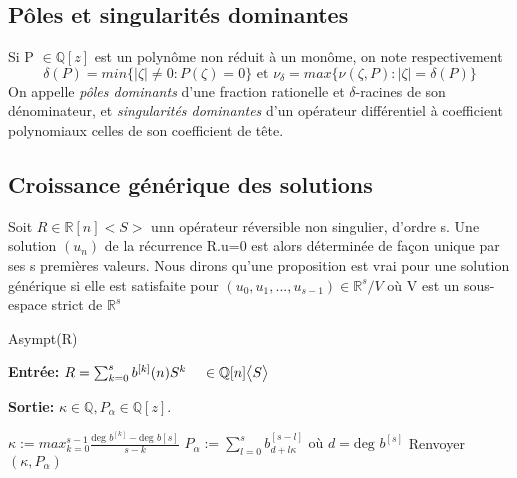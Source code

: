 \documentclass[a4paper,10.5pt]{article}
\begin{document}
	\subsection{Pôles et singularités dominantes}
	
	\begin{definition} Si P $\in \mathbb{Q}[z]$ est un polynôme non réduit à un monôme, on note respectivement
		\[\delta(P)=min\{|\zeta| \neq 0: P(\zeta)=0\} \text{ et } \nu_{\delta}=max\{\nu(\zeta,P):|\zeta|=\delta(P)\}\] 
		On appelle \textit{pôles dominants} d'une fraction rationelle et $\delta$-racines  de son dénominateur, et \textit{singularités dominantes} d'un opérateur différentiel à coefficient polynomiaux celles de son coefficient de tête.  
	\end{definition}
	
	\subsection{Croissance générique des solutions}
	
	\begin{definition} Soit $R \in \mathbb{R}[n]\big< S\big>$ unn opérateur réversible non singulier, d'ordre s. Une solution $(u_{n})$ de la récurrence R.u=0 est alors déterminée de façon unique par ses s premières valeurs. Nous dirons qu'une proposition est vrai pour une solution générique si elle est satisfaite pour $(u_{0},u_{1},...,u_{s-1}) \in \mathbb{R}^{s}/V$ où V est un sous-espace strict de $\mathbb{R}^{s}$
		
	\end{definition}
	
	\begin{algorithm}
		\caption{Asympt(R)}
		
		\vspace{2mm}
		
		\textbf{Entrée:} $R=\sum_{k=0}^{s} b^{[k]}(n)S^{k} \hspace{4mm} \in \mathbb{Q}[n]\big<S\big>$
		
		\textbf{Sortie:} $\kappa \in \mathbb{Q}, P_{\alpha} \in \mathbb{Q}[z].$
		
		\begin{algorithmic}[1]
			\vspace{4mm}
			\STATE $\kappa:= max_{k=0}^{s-1}\frac{\text{deg } b^{[k]}-\text{deg } b{[s]}}{s-k}$
			\vspace{4mm}
			\STATE $P_{\alpha}:=\sum_{l=0}^{s} b_{d+l\kappa}^{[s-l]}\text{ où } d=\text{deg } b^{[s]}$
			\vspace{4mm}
			\STATE Renvoyer $(\kappa,P_{\alpha})$
		\end{algorithmic}
		
	\end{algorithm}
	
\end{document}
